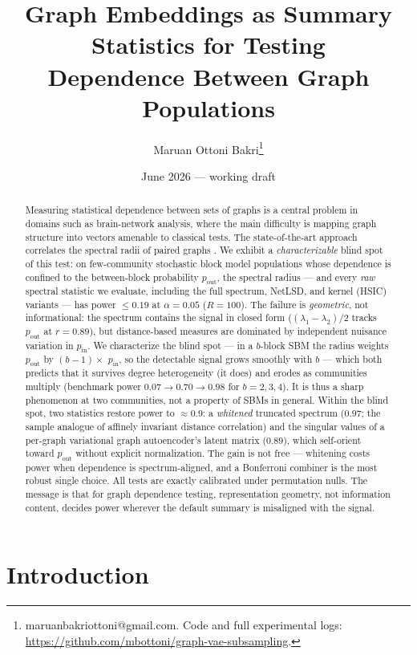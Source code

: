 \documentclass[11pt]{article}
\title{Graph Embeddings as Summary Statistics for Testing\\
Dependence Between Graph Populations}
\author{Maruan Ottoni Bakri\thanks{maruanbakriottoni@gmail.com. Code and full
experimental logs: \url{https://github.com/mbottoni/graph-vae-subsampling}.}}
\date{June 2026 --- working draft}
\begin{document}
\maketitle

\begin{abstract}
Measuring statistical dependence between sets of graphs is a central problem in
domains such as brain-network analysis, where the main difficulty is mapping
graph structure into vectors amenable to classical tests. The state-of-the-art
approach correlates the spectral radii of paired graphs
\citep{fujita2017correlation}. We exhibit a \emph{characterizable} blind spot of
this test: on few-community stochastic block model populations whose dependence
is confined to the between-block probability $p_{\mathrm{out}}$, the spectral
radius --- and every \emph{raw} spectral statistic we evaluate, including the
full spectrum, NetLSD, and kernel (HSIC) variants --- has power
$\le 0.19$ at $\alpha = 0.05$ ($R = 100$). The failure is \emph{geometric}, not
informational: the spectrum contains the signal in closed form
($(\lambda_1 - \lambda_2)/2$ tracks $p_{\mathrm{out}}$ at $r = 0.89$), but
distance-based measures are dominated by independent nuisance variation in
$p_{\mathrm{in}}$. We characterize the blind spot --- in a
$b$-block SBM the radius weights $p_{\mathrm{out}}$ by $(b{-}1)\times$
$p_{\mathrm{in}}$, so the detectable signal grows smoothly with $b$ --- which
both predicts that it survives degree heterogeneity (it does) and erodes as
communities multiply (benchmark power $0.07 \to 0.70 \to 0.98$ for
$b = 2, 3, 4$). It is thus a sharp phenomenon at two communities, not a property
of SBMs in general. Within the blind spot, two statistics restore power
to $\approx 0.9$: a \emph{whitened} truncated spectrum ($0.97$; the sample
analogue of affinely invariant distance correlation) and the singular values of
a per-graph variational graph autoencoder's latent matrix ($0.89$), which
self-orient toward $p_{\mathrm{out}}$ without explicit normalization. The gain
is not free --- whitening costs power when dependence is spectrum-aligned, and a
Bonferroni combiner is the most robust single choice. All tests are exactly
calibrated under permutation nulls. The message is that for graph dependence
testing, representation geometry, not information content, decides power
wherever the default summary is misaligned with the signal.
\end{abstract}

\section{Introduction}
\end{document}
